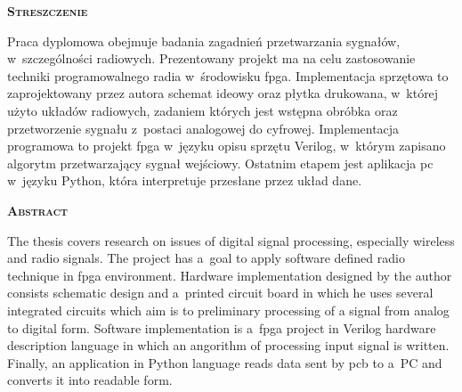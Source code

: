 \newpage
\thispagestyle{empty}

\vspace*{1.5cm}
{	
	\LARGE
	\textsc{\textbf{Streszczenie}}
}
\vspace*{0.5cm}

Praca dyplomowa obejmuje badania zagadnień przetwarzania sygnałów,
w~szczególności radiowych. Prezentowany projekt ma na celu zastosowanie
techniki programowalnego radia w~środowisku \gls{fpga}. Implementacja sprzętowa
to zaprojektowany przez autora schemat ideowy oraz płytka drukowana, w~której użyto układów
radiowych, zadaniem których jest wstępna obróbka oraz przetworzenie sygnału
z~postaci analogowej do cyfrowej. Implementacja programowa to projekt \gls{fpga}
w~języku opisu sprzętu Verilog, w~którym zapisano algorytm przetwarzający
sygnał wejściowy. Ostatnim etapem jest aplikacja \gls{pc} w~języku Python, która
interpretuje przesłane przez układ dane.

\vspace*{1.5cm}
{
	\LARGE
	\textsc{\textbf{Abstract}}
}
\vspace*{0.5cm}

The thesis covers research on issues of digital signal processing, especially
wireless and radio signals. The project has a~goal to apply software defined
radio technique in \gls{fpga} environment. Hardware implementation designed by
the author consists schematic design and a~printed circuit board in which he uses several integrated circuits
which aim is to preliminary processing of a signal from analog to digital form.
Software implementation is a~\gls{fpga} project in Verilog hardware description
language in which an angorithm of processing input signal is written. Finally,
an application in Python language reads data sent by \gls{pcb} to a~PC and
converts it into readable form.
